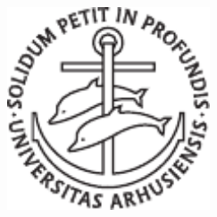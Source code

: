 \begin{titlepage}
	\begin{addmargin}[-1cm]{-3cm}
    \begin{center}
        \large  

        \hfill

        \vfill

        \begingroup
            \color{Maroon}\spacedallcaps{\myTitle} \\ \bigskip
        \endgroup

        \spacedlowsmallcaps{\myName}\\
        \spacedlowsmallcaps{\myNameToo}

        \vfill

        \includegraphics[width=6cm]{gfx/au-logo} \\ \medskip

        \mySubtitle \\ \medskip   
        \myDegree \\
        \myDepartment \\                            
        \myFaculty \\
        \myUni \\ \bigskip

        \myTime

        \vfill                      

    \end{center}  
  \end{addmargin}       
\end{titlepage}   
